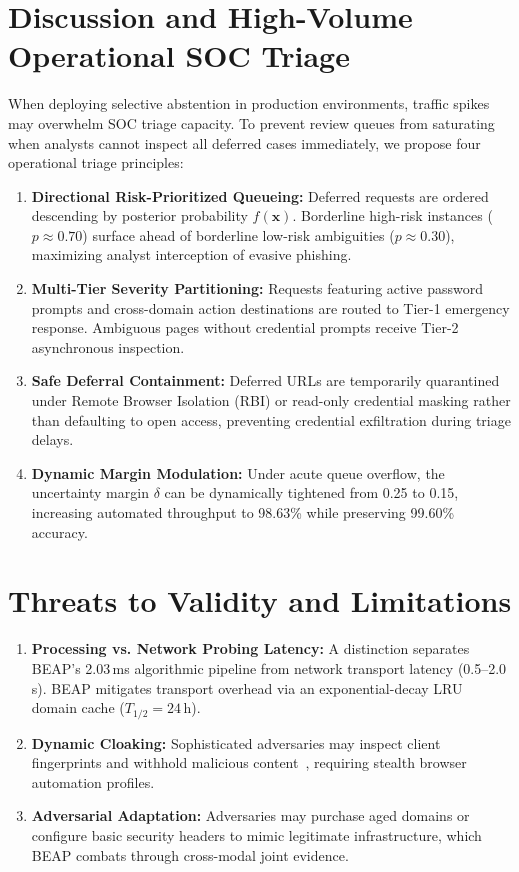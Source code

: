 \documentclass{llncs}
\begin{document}
\section{Discussion and High-Volume Operational SOC Triage}

When deploying selective abstention in production environments, traffic spikes may overwhelm SOC triage capacity. To prevent review queues from saturating when analysts cannot inspect all deferred cases immediately, we propose four operational triage principles:
\begin{enumerate}[leftmargin=1.8em]
    \item \textbf{Directional Risk-Prioritized Queueing:} Deferred requests are ordered descending by posterior probability $f(\mathbf{x})$. Borderline high-risk instances ($p \approx 0.70$) surface ahead of borderline low-risk ambiguities ($p \approx 0.30$), maximizing analyst interception of evasive phishing.
    \item \textbf{Multi-Tier Severity Partitioning:} Requests featuring active password prompts and cross-domain action destinations are routed to Tier-1 emergency response. Ambiguous pages without credential prompts receive Tier-2 asynchronous inspection.
    \item \textbf{Safe Deferral Containment:} Deferred URLs are temporarily quarantined under Remote Browser Isolation (RBI) or read-only credential masking rather than defaulting to open access, preventing credential exfiltration during triage delays.
    \item \textbf{Dynamic Margin Modulation:} Under acute queue overflow, the uncertainty margin $\delta$ can be dynamically tightened from 0.25 to 0.15, increasing automated throughput to 98.63\% while preserving 99.60\% accuracy.
\end{enumerate}

\section{Threats to Validity and Limitations}

\begin{enumerate}[leftmargin=1.8em]
    \item \textbf{Processing vs. Network Probing Latency:} A distinction separates BEAP's 2.03\,ms algorithmic pipeline from network transport latency (0.5--2.0\,s). BEAP mitigates transport overhead via an exponential-decay LRU domain cache ($T_{1/2} = 24$\,h).
    \item \textbf{Dynamic Cloaking:} Sophisticated adversaries may inspect client fingerprints and withhold malicious content~\cite{lin2021}, requiring stealth browser automation profiles.
    \item \textbf{Adversarial Adaptation:} Adversaries may purchase aged domains or configure basic security headers to mimic legitimate infrastructure, which BEAP combats through cross-modal joint evidence.
\end{enumerate}
\end{document}
